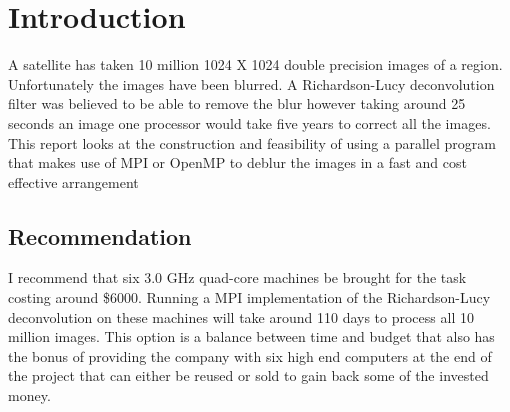 \section*{Introduction}

A satellite has taken 10 million 1024 X 1024 double precision images of a region. Unfortunately the images have been blurred. A Richardson-Lucy deconvolution filter was believed to be able to remove the blur however taking around 25 seconds an image one processor would take five years to correct all the images. This report looks at the construction and feasibility of using a parallel program that makes use of MPI or OpenMP to deblur the images in a fast and cost effective arrangement

\subsection*{Recommendation}
I recommend that six 3.0 GHz quad-core machines be brought for the task costing around \$6000. Running a MPI implementation of the Richardson-Lucy deconvolution on these machines will take around 110 days to process all 10 million images. This option is a balance between time and budget that also has the bonus of providing the company with six high end computers at the end of the project that can either be reused or sold to gain back some of the invested money.